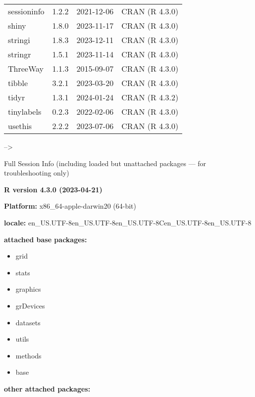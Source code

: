 \documentclass[
]{article}
\providecommand{\tightlist}{%
  \setlength{\itemsep}{0pt}\setlength{\parskip}{0pt}}
\begin{document}
\begin{table}
\begin{tabular}[t]{llll}
sessioninfo & 1.2.2 & 2021-12-06 & CRAN (R 4.3.0)\\
\addlinespace
shiny & 1.8.0 & 2023-11-17 & CRAN (R 4.3.0)\\
stringi & 1.8.3 & 2023-12-11 & CRAN (R 4.3.0)\\
stringr & 1.5.1 & 2023-11-14 & CRAN (R 4.3.0)\\
ThreeWay & 1.1.3 & 2015-09-07 & CRAN (R 4.3.0)\\
tibble & 3.2.1 & 2023-03-20 & CRAN (R 4.3.0)\\
\addlinespace
tidyr & 1.3.1 & 2024-01-24 & CRAN (R 4.3.2)\\
tinylabels & 0.2.3 & 2022-02-06 & CRAN (R 4.3.0)\\
usethis & 2.2.2 & 2023-07-06 & CRAN (R 4.3.0)\\
\bottomrule
\end{tabular}
\end{table}

--\textgreater{}

Full Session Info (including loaded but unattached packages --- for
troubleshooting only)

\textbf{R version 4.3.0 (2023-04-21)}

\textbf{Platform:} x86\_64-apple-darwin20 (64-bit)

\textbf{locale:}
en\_US.UTF-8\textbar\textbar en\_US.UTF-8\textbar\textbar en\_US.UTF-8\textbar\textbar C\textbar\textbar en\_US.UTF-8\textbar\textbar en\_US.UTF-8

\textbf{attached base packages:}

\begin{itemize}
\tightlist
\item
  grid
\item
  stats
\item
  graphics
\item
  grDevices
\item
  datasets
\item
  utils
\item
  methods
\item
  base
\end{itemize}

\textbf{other attached packages:}
\end{document}
